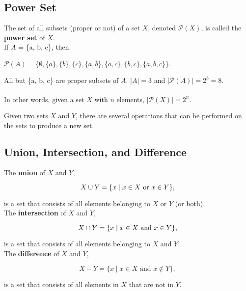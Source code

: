 \clearpage

\subsection*{Power Set}

The set of all subsets (proper or not) of a set $X$, denoted $\mathcal{P}(X)$, is called the \textbf{power set} of 
$X$.\\

If $A$ = \{a, b, c\}, then

\begin{center}
$\mathcal{P}(A) = \{\emptyset, \{a\}, \{b\}, \{c\}, \{a, b\}, \{a, c\}, \{b, c\}, \{a, b, c\}\}$.
\end{center}

All but \{a, b, c\} are proper subsets of $A$. $|A| = 3$ and $|\mathcal{P}(A)| = 2^3 = 8$.\\\\
In other words, given a set $X$ with $n$ elements, $|\mathcal{P}(X)| = 2^n$. 

Given two sets $X$ and $Y$, there are several operations that can be performed on the sets to produce a new set.\\

\subsection*{Union, Intersection, and Difference}

The \textbf{union} of $X$ and $Y$,

\[
    X \cup Y = \{x \mid x \in X \text{ or } x \in Y\},
\]

is a set that consists of all elements belonging to $X$ or $Y$ (or both).\\

The \textbf{intersection} of $X$ and $Y$,

\[
    X \cap Y = \{x \mid x \in X \text{ and } x \in Y\},
\]

is a set that consists of all elements belonging to $X$ and $Y$.\\

The \textbf{difference} of $X$ and $Y$,

\[
    X - Y = \{x \mid x \in X \text{ and } x \not\in Y\},
\]

is a set that consists of all elements in $X$ that are not in $Y$.\\

